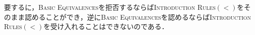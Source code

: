 \documentclass[twoside,14Q,uplatex,dvipdfmx]{jsarticle}
\theoremstyle{definition}
\begin{document}
要するに，\textsc{Basic Equivalences}を拒否するならば\textsc{Introduction Rules$(<)$}をそのまま認めることができ，逆に\textsc{Basic Equivalences}を認めるならば\textsc{Introduction Rules$(<)$}を受け入れることはできないのである．

\end{document}
